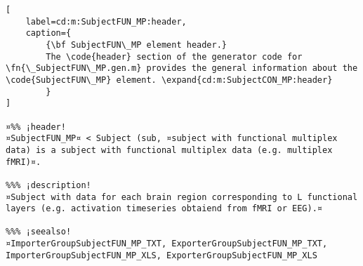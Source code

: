 \documentclass{tufte-handout}
\begin{document}
\begin{lstlisting}[
	label=cd:m:SubjectFUN_MP:header,
	caption={
		{\bf SubjectFUN\_MP element header.}
		The \code{header} section of the generator code for \fn{\_SubjectFUN\_MP.gen.m} provides the general information about the \code{SubjectFUN\_MP} element. \expand{cd:m:SubjectCON_MP:header}
		}
]

¤%% ¡header!
¤SubjectFUN_MP¤ < Subject (sub, ¤subject with functional multiplex data) is a subject with functional multiplex data (e.g. multiplex fMRI)¤.

%%% ¡description!
¤Subject with data for each brain region corresponding to L functional layers (e.g. activation timeseries obtaiend from fMRI or EEG).¤

%%% ¡seealso!
¤ImporterGroupSubjectFUN_MP_TXT, ExporterGroupSubjectFUN_MP_TXT, ImporterGroupSubjectFUN_MP_XLS, ExporterGroupSubjectFUN_MP_XLS
\end{lstlisting}
\end{document}
